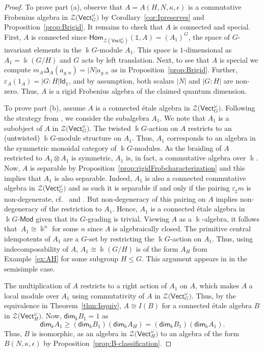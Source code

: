 \documentclass[10pt,a4paper]{amsart}
\numberwithin{equation}{section}
\newcommand{\lmod}[1]{#1\text{-}\mathsf{Mod}}
\newcommand{\Hom}{\mathsf{Hom}}
\newcommand{\ide}{\mathsf{Id}}
\newcommand{\one}{\mathds{1}}
\renewcommand{\dim}{\mathsf{dim}}
\newcommand{\Vect}{\mathsf{Vect}}
\newcommand{\cZ}{\mathcal{Z}}
\newcommand{\rI}{I}
\begin{document}
\begin{proof}
To prove part (a), observe that $A=A(H,N,\kappa,\epsilon)$ is a commutative Frobenius algebra in $\cZ\big(\Vect_G^\omega\big)$ by Corollary~\ref{cor:Ipreserves} and Proposition~\ref{prop:Brigid}. It remains to check that $A$ is connected and special. First, $A$ is connected since
$\Hom_{\cZ(\Vect_G^\omega)}(\one,A)= (A_1)^G$, the space of $G$-invariant elements in the $\Bbbk G$-module $A_1$. This space is $1$-dimensional as $A_1=\Bbbk(G/H)$ and $G$ acts by left translation. Next, to see that $A$ is special we compute
$m_A\Delta_A(a_{g,n})=|N| a_{g,n}$ as in Proposition~\ref{prop:Brigid}. Further, $\varepsilon_A(1_A)=|G:H|\ide_{\one}$,
and by assumption, both scalars $|N|$ and $|G:H|$ are non-zero. Thus, $A$ is a rigid Frobenius algebra of the claimed quantum dimension.

To prove part (b), assume $A$ is a connected \'etale algebra in $\cZ\big(\Vect_G^\omega\big)$. Following the strategy from \cite[Corollary~3.3.5]{Dav3}, we consider the subalgebra $A_1$. We note that $A_1$ is a subobject of $A$ in $\cZ\big(\Vect_G^\omega\big)$. The twisted $\Bbbk G$-action on $A$ restricts to an (untwisted) $\Bbbk G$-module structure on $A_1$.
Thus, $A_1$ corresponds to an algebra in the symmetric monoidal category of $\Bbbk G$-modules. As the braiding of $A$ restricted to $A_1\otimes A_1$ is symmetric, $A_1$ is, in fact, a commutative algebra over $\Bbbk$.
Now, $A$ is separable by Proposition~\ref{prop:rigidFrobcharacterization} and this implies that $A_1$ is also separable. Indeed, $A_1$ is also a connected commutative algebra in $\cZ\big(\Vect_G^\omega\big)$ and as such it is separable if and only if the pairing $\varepsilon_\sharp m$ is non-degenerate, cf.\ \cite[Section 2.2]{Dav3} and \cite[Section 3.3]{LW3}. But non-degeneracy of this pairing on $A$ implies non-degeneracy of the restriction to $A_1$.
Hence, $A_1$ is a connected \'etale algebra in $\lmod{\Bbbk G}$ given that its $G$-grading is trivial. Viewing $A$ as a $\Bbbk$-algebra, it follows that~$A_1\cong \Bbbk ^n$ for some $n$ since $A$ is algebraically closed. The primitive central idempotents of $A_1$ are a $G$-set by restricting the $\Bbbk G$-action on $A_1$. Thus, using indecomposability of $A$, $A_1\cong \Bbbk(G/H)$ is of the form $A_H$ from Example~\ref{ex:AH} for some subgroup $H\leq G$. This argument appears in \cite[Theorem~2.2]{KO} in the semisimple case.

The multiplication of $A$ restricts to a right action of $A_1$ on $A$, which makes $A$ a local module over $A_1$ using commutativity of $A$ in $\cZ\big(\Vect_G^\omega\big)$. Thus, by the equivalence in Theorem~\ref{thm:Iequiv}, $A\cong \rI(B)$ for a connected \'etale algebra $B$ in $\cZ\big(\Vect_H^\omega\big)$.
Now, $\dim_\Bbbk B_1=1$ as \[\dim_\Bbbk A_1\geq (\dim_\Bbbk B_1)(\dim_\Bbbk A_H)=(\dim_\Bbbk B_1)(\dim_\Bbbk A_1).\]
Thus, $B$ is isomorphic, as an algebra in $\cZ\big(\Vect_H^\omega\big)$ to an algebra of the form $B(N,\kappa, \epsilon)$ by Proposition~\ref{prop:B-classification}.


\end{proof}
\end{document}
